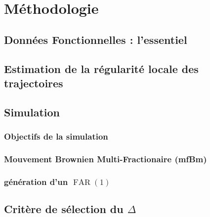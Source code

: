 \chapter{Méthodologie}
\minitoc%

\section{Données Fonctionnelles : l'essentiel}



\section{Estimation de la régularité locale des trajectoires}




\section{Simulation}

\subsection{Objectifs de la simulation}



\subsection{Mouvement Brownien Multi-Fractionaire (mfBm)}



% 

\subsection{génération d'un $\operatorname{FAR}(1)$}



\section{Critère de sélection du $\Delta$}
\label{sec:choix_risque_couple}


